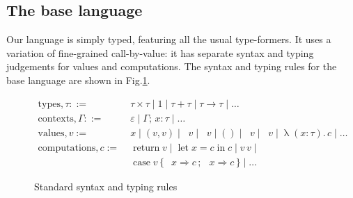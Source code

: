 \documentclass[acmsmall, screen, review, anonymous]{acmart}
\theoremstyle{definition}
\newcommand{\seq}{\,;\,}
\newcommand{\fst}{\mathop{\pi_1}}
\newcommand{\snd}{\mathop{\pi_2}}
\newcommand{\inl}[1]{\mathop{\mathrm{in}_L} #1}
\newcommand{\inr}[1]{\mathop{\mathrm{in}_R} #1}
\newcommand{\case}[5]{\mathop{\mathrm{case}} #1 \,\{\,\inl{#2} \Rightarrow #3 \seq \inr{#4} \Rightarrow #5 \,\}}
\newcommand{\abs}[3]{\mathop{\lambda}(#1 \types #2).\,#3}
\newcommand{\app}[2]{#1\,#2}
\newcommand{\types}{\mathrel{:}}
\newcommand{\cempty}{\varepsilon}
\newcommand{\ccons}[2]{#1;\,#2}
\newcommand{\lbind}[3]{\ccons{#1}{#2\types#3}}
\newcommand{\return}[1]{\mathop{\mathrm{return}} #1}
\newcommand{\letv}[3]{\mathop{\mathrm{let}} #1 = #2 \mathop{\mathrm{in}} #3}
\newcommand{\turnv}{\mathrel{\vdash_V}}
\newcommand{\turnc}{\mathrel{\vdash_C}}
\begin{document}
\subsection{The base language}

Our language is simply typed, featuring all the usual type-formers. It
uses a variation of fine-grained call-by-value: it has separate syntax
and typing judgements for values and computations. The syntax and typing
rules for the base language are shown in Fig.\ref{fig:typing-standard}.
\begin{figure}
\begin{align*}
  \mathrm{types}, \tau ::=\;& \tau \times \tau \mid 1 \mid \tau + \tau
                              \mid \tau \rightarrow \tau \mid \ldots \\
  \mathrm{contexts}, \Gamma ::=\;& \cempty \mid \lbind{\Gamma}{x}{\tau} \mid \ldots \\
  \mathrm{values}, v :=\;& x \mid (v, v) \mid \fst v \mid \snd v
                           \mid () \mid \inl{v} \mid \inr{v} \mid \abs{x}{\tau}{c} \mid \ldots \\
  \mathrm{computations}, c :=\;& \return{v} \mid \letv{x}{c}{c}
                                 \mid \app{v}{v} \mid \\
                            & \case{v}{x}{c}{x}{c} \mid \ldots
\end{align*}
\caption{Standard syntax and typing rules}
\label{fig:typing-standard}
\end{figure}
\end{document}
